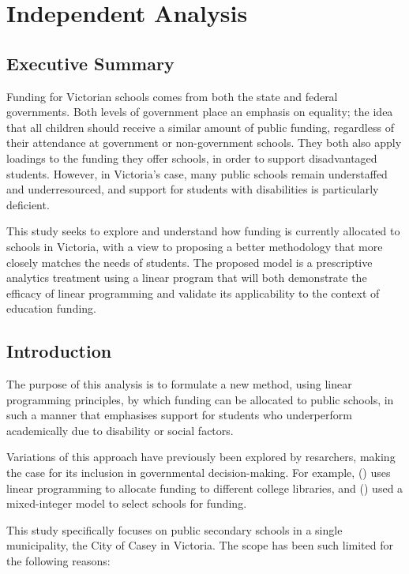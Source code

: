 \documentclass[11pt, a4paper]{article}
\begin{document}
    \newpage

    \section{Independent Analysis}

    \subsection{Executive Summary}

    Funding for Victorian schools comes from both the state and federal governments. Both levels of government place an emphasis on equality; the idea that all children should receive a similar amount of public funding, regardless of their attendance at government or non-government schools. They both also apply loadings to the funding they offer schools, in order to support disadvantaged students. However, in Victoria's case, many public schools remain understaffed and underresourced, and support for students with disabilities is particularly deficient. 

    This study seeks to explore and understand how funding is currently allocated to schools in Victoria, with a view to proposing a better methodology that more closely matches the needs of students. The proposed model is a prescriptive analytics treatment using a linear program that will both demonstrate the efficacy of linear programming and validate its applicability to the context of education funding.

    \subsection{Introduction} \label{intro}

    The purpose of this analysis is to formulate a new method, using linear programming principles, by which funding can be allocated to public schools, in such a manner that emphasises support for students who underperform academically due to disability or social factors.

    Variations of this approach have previously been explored by resarchers, making the case for its inclusion in governmental decision-making. For example,  () uses linear programming to allocate funding to different college libraries, and  () used a mixed-integer model to select schools for funding. 
    
    This study specifically focuses on public secondary schools in a single municipality, the City of Casey in Victoria. The scope has been such limited for the following reasons:
\end{document}
